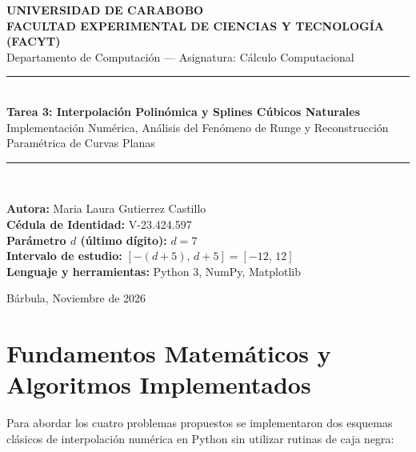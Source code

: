 \documentclass[11pt,letterpaper]{article}
\begin{document}
\begin{titlepage}
    \centering
    {\large \textbf{UNIVERSIDAD DE CARABOBO}}\\[0.15cm]
    {\large \textbf{FACULTAD EXPERIMENTAL DE CIENCIAS Y TECNOLOGÍA (FACYT)}}\\[0.15cm]
    {\normalsize Departamento de Computación --- Asignatura: Cálculo Computacional}\\[2.2cm]

    \rule{\linewidth}{0.5mm}\\[0.4cm]
    {\LARGE \textbf{Tarea 3: Interpolación Polinómica y Splines Cúbicos Naturales}}\\[0.3cm]
    {\large Implementación Numérica, Análisis del Fenómeno de Runge y Reconstrucción Paramétrica de Curvas Planas}\\[0.2cm]
    \rule{\linewidth}{0.5mm}\\[2.0cm]

    \begin{flushleft}
        \hspace{2.2cm}\textbf{Autora:} Maria Laura Gutierrez Castillo \\
        \hspace{2.2cm}\textbf{Cédula de Identidad:} V-23.424.597 \\
        \hspace{2.2cm}\textbf{Parámetro $d$ (último dígito):} $d = 7$ \\
        \hspace{2.2cm}\textbf{Intervalo de estudio:} $[-(d+5),\, d+5] = [-12,\, 12]$ \\
        \hspace{2.2cm}\textbf{Lenguaje y herramientas:} Python 3, NumPy, Matplotlib
    \end{flushleft}

    \vfill
    {\normalsize Bárbula, Noviembre de 2026}
\end{titlepage}

\tableofcontents
\newpage

\section{Fundamentos Matemáticos y Algoritmos Implementados}

Para abordar los cuatro problemas propuestos se implementaron dos esquemas clásicos de interpolación numérica en Python sin utilizar rutinas de caja negra:
\end{document}
